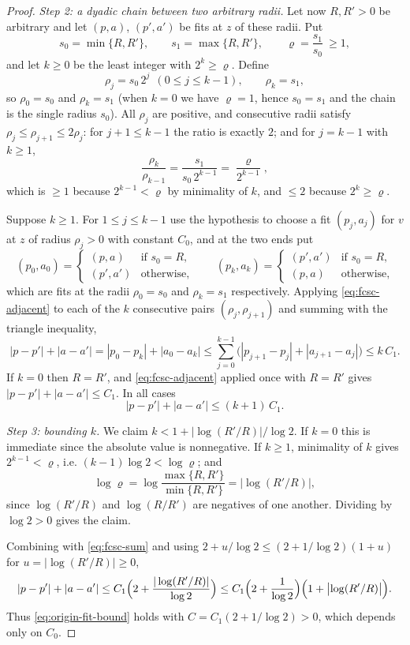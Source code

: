 \begin{proof}
\emph{Step 2: a dyadic chain between two arbitrary radii.}
Let now $R,R'>0$ be arbitrary and let $(p,a)$, $(p',a')$ be fits at $z$ of these
radii. Put
\[
  s_0=\min\{R,R'\},\qquad s_1=\max\{R,R'\},\qquad
  \varrho=\frac{s_1}{s_0}\ \ge1 ,
\]
and let $k\ge0$ be the least integer with $2^k\ge\varrho$. Define
\[
  \rho_j=s_0\,2^j\ \ (0\le j\le k-1),\qquad \rho_k=s_1 ,
\]
so $\rho_0=s_0$ and $\rho_k=s_1$ (when $k=0$ we have $\varrho=1$, hence
$s_0=s_1$ and the chain is the single radius $s_0$). All $\rho_j$ are positive,
and consecutive radii satisfy $\rho_j\le\rho_{j+1}\le2\rho_j$: for $j+1\le k-1$
the ratio is exactly $2$; and for $j=k-1$ with $k\ge1$,
\[
  \frac{\rho_k}{\rho_{k-1}}=\frac{s_1}{s_0\,2^{k-1}}=\frac{\varrho}{2^{k-1}},
\]
which is $\ge1$ because $2^{k-1}<\varrho$ by minimality of $k$, and $\le2$
because $2^k\ge\varrho$.

Suppose $k\ge1$. For $1\le j\le k-1$ use the hypothesis to choose a fit
$(p_j,a_j)$ for $v$ at $z$ of radius $\rho_j>0$ with constant $C_0$, and at the
two ends put
\[
  (p_0,a_0)=\begin{cases}(p,a)&\text{if }s_0=R,\\(p',a')&\text{otherwise},\end{cases}
  \qquad
  (p_k,a_k)=\begin{cases}(p',a')&\text{if }s_0=R,\\(p,a)&\text{otherwise},\end{cases}
\]
which are fits at the radii $\rho_0=s_0$ and $\rho_k=s_1$ respectively. Applying
\eqref{eq:fcsc-adjacent} to each of the $k$ consecutive pairs
$(\rho_j,\rho_{j+1})$ and summing with the triangle inequality,
\[
  |p-p'|+|a-a'|=|p_0-p_k|+|a_0-a_k|
   \le\sum_{j=0}^{k-1}\bigl(|p_{j+1}-p_j|+|a_{j+1}-a_j|\bigr)\le k\,C_1 .
\]
If $k=0$ then $R=R'$, and \eqref{eq:fcsc-adjacent} applied once with $R=R'$
gives $|p-p'|+|a-a'|\le C_1$. In all cases
\begin{equation}\label{eq:fcsc-sum}
  |p-p'|+|a-a'|\le(k+1)\,C_1 .
\end{equation}

\emph{Step 3: bounding $k$.}
We claim $k<1+\bigl|\log(R'/R)\bigr|/\log2$. If $k=0$ this is immediate since
the absolute value is nonnegative. If $k\ge1$, minimality of $k$ gives
$2^{k-1}<\varrho$, i.e. $(k-1)\log2<\log\varrho$; and
\[
  \log\varrho=\log\frac{\max\{R,R'\}}{\min\{R,R'\}}
   =\bigl|\log(R'/R)\bigr| ,
\]
since $\log(R'/R)$ and $\log(R/R')$ are negatives of one another. Dividing by
$\log2>0$ gives the claim.

Combining with \eqref{eq:fcsc-sum} and using
$2+u/\log2\le(2+1/\log2)(1+u)$ for $u=|\log(R'/R)|\ge0$,
\[
  |p-p'|+|a-a'|\le C_1\Bigl(2+\frac{|\log(R'/R)|}{\log2}\Bigr)
   \le C_1\Bigl(2+\frac1{\log2}\Bigr)\Bigl(1+\bigl|\log(R'/R)\bigr|\Bigr).
\]
Thus \eqref{eq:origin-fit-bound} holds with $C=C_1(2+1/\log2)>0$, which depends
only on $C_0$.
\end{proof}
